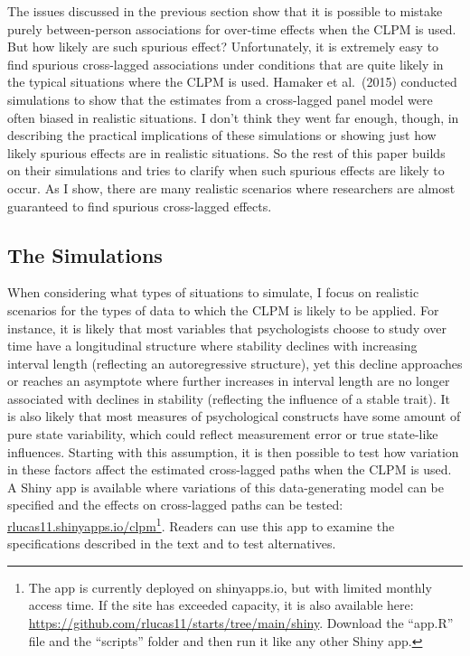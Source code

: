 \documentclass[
  english,
  man,floatsintext]{apa6}
\begin{document}
The issues discussed in the previous section show that it is possible to mistake purely between-person associations for over-time effects when the CLPM is used. But how likely are such spurious effect? Unfortunately, it is extremely easy to find spurious cross-lagged associations under conditions that are quite likely in the typical situations where the CLPM is used. Hamaker et al.~(2015) conducted simulations to show that the estimates from a cross-lagged panel model were often biased in realistic situations. I don't think they went far enough, though, in describing the practical implications of these simulations or showing just how likely spurious effects are in realistic situations. So the rest of this paper builds on their simulations and tries to clarify when such spurious effects are likely to occur. As I show, there are many realistic scenarios where researchers are almost guaranteed to find spurious cross-lagged effects.

\hypertarget{the-simulations}{%
\subsection{The Simulations}\label{the-simulations}}

When considering what types of situations to simulate, I focus on realistic scenarios for the types of data to which the CLPM is likely to be applied. For instance, it is likely that most variables that psychologists choose to study over time have a longitudinal structure where stability declines with increasing interval length (reflecting an autoregressive structure), yet this decline approaches or reaches an asymptote where further increases in interval length are no longer associated with declines in stability (reflecting the influence of a stable trait). It is also likely that most measures of psychological constructs have some amount of pure state variability, which could reflect measurement error or true state-like influences. Starting with this assumption, it is then possible to test how variation in these factors affect the estimated cross-lagged paths when the CLPM is used. A Shiny app is available where variations of this data-generating model can be specified and the effects on cross-lagged paths can be tested: \href{https://rlucas11.shinyapps.io/clpm}{rlucas11.shinyapps.io/clpm}\footnote{The app is currently deployed on shinyapps.io, but with limited monthly access time. If the site has exceeded capacity, it is also available here: \url{https://github.com/rlucas11/starts/tree/main/shiny}. Download the ``app.R'' file and the ``scripts'' folder and then run it like any other Shiny app.}. Readers can use this app to examine the specifications described in the text and to test alternatives.
\end{document}
